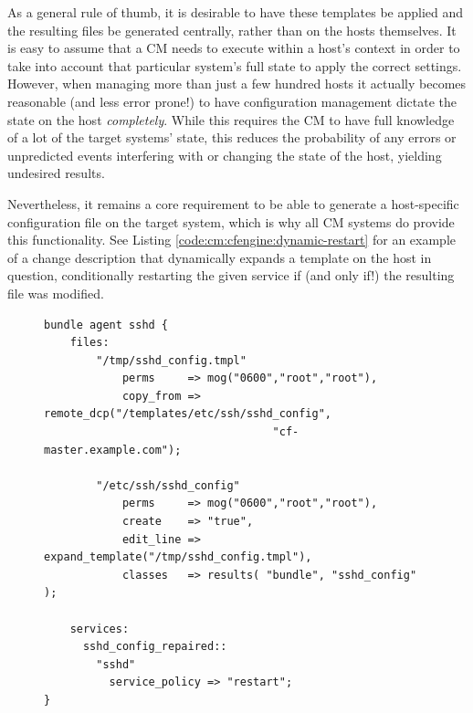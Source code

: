 As a general rule of thumb, it is desirable to have
these templates be applied and the resulting files be
generated centrally, rather than on the hosts
themselves.  It is easy to assume that a CM needs to
execute within a host's context in order to take into
account that particular system's full state to apply
the correct settings.  However, when managing more
than just a few hundred hosts it actually becomes
reasonable (and less error prone!) to have
configuration management dictate the state on the
host {\em completely}.  While this requires the CM to
have full knowledge of a lot of the target systems'
state, this reduces the probability of any errors or
unpredicted events interfering with or changing the
state of the host, yielding undesired results.

Nevertheless, it remains a core requirement to be able
to generate a host-specific configuration file on the
target system, which is why all CM systems do provide
this functionality.  See Listing
\ref{code:cm:cfengine:dynamic-restart} for an example
of a change description that dynamically expands a
template on the host in question, conditionally
restarting the given service if (and only if!) the
resulting file was modified.


\begin{figure}[!t]
\begin{minipage}{.98\linewidth}
\begin{lstlisting}[basicstyle=\scriptsize,label=code:cm:cfengine:dynamic-restart,caption={[A
CFEngine ``agent bundle'']An ``agent bundle'',
CFEngine's way to express user defined change
descriptions that install an \manpage{sshd\_config(5)}
file by way of copying a template from the
configuration master to the local system and expanding
it in place before finally restarting \manpage{sshd(8)} if necessary.}]
bundle agent sshd {
    files:
        "/tmp/sshd_config.tmpl"
            perms     => mog("0600","root","root"),
            copy_from => remote_dcp("/templates/etc/ssh/sshd_config",
                                   "cf-master.example.com");

        "/etc/ssh/sshd_config"
            perms     => mog("0600","root","root"),
            create    => "true",
            edit_line => expand_template("/tmp/sshd_config.tmpl"),
            classes   => results( "bundle", "sshd_config" );

    services:
      sshd_config_repaired::
        "sshd"
          service_policy => "restart";
}
\end{lstlisting}
\end{minipage}
\end{figure}

